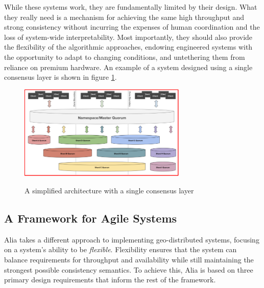 \documentclass[sigplan,screen,review,anonymous,nonacm]{acmart}
\begin{document}
While these systems work, they are fundamentally limited by their design.
What they really need is a mechanism for achieving the same high throughput 
and strong consistency without incurring the expenses of human coordination and the 
loss of system-wide interpretability.
Most importantly, they should also provide the flexibility of the algorithmic 
approaches, endowing engineered systems with the opportunity to adapt to changing 
conditions, and untethering them from reliance on premium hardware.
An example of a system designed using a single consensus layer is shown in figure
\ref{fig:simplified_architecture}.

\begin{figure}
\caption{A simplified architecture with a single consensus layer}
\centering
\includegraphics[width=8cm]{figure_2_simplified_architecture.png}
\label{fig:simplified_architecture}
\end{figure}


\subsection{A Framework for Agile Systems}

Alia takes a different approach to implementing geo-distributed systems, focusing
on a system's ability to be \emph{flexible}. 
Flexibility ensures that the system can balance requirements for throughput and 
availability while still maintaining the strongest possible consistency semantics.
To achieve this, Alia is based on three primary design requirements that inform the 
rest of the framework.
\end{document}
